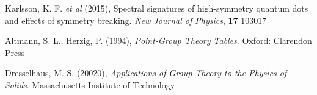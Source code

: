 \documentclass[12pt]{article}
\begin{document}
	\begin{thebibliography}{10}

Karlsson, K. F. \textit{et al} (2015), Spectral signatures of high-symmetry quantum dots and effects of symmetry breaking. \textit{New Journal of Physics}, \textbf{17} 103017

Altmann, S. L., Herzig, P. (1994), \textit{Point-Group Theory Tables}. Oxford: Clarendon Press

Dresselhaus, M. S. (20020), \textit{Applications of Group Theory to the Physics of Solids}. Massachusetts Institute of Technology


\end{thebibliography}	
	
\end{document}
